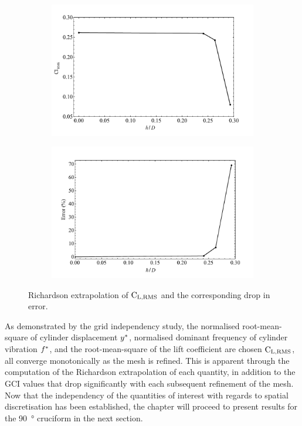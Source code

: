 \documentclass[oneside]{utmthesis}
\begin{document}
\begin{figure}
  \centering
  \begin{subfigure}[h]{1\textwidth}
    \includegraphics[width=\textwidth]{figs/gciClrms-1}
    \caption{}
    \label{fig:gciClrms-1}
  \end{subfigure}

  \begin{subfigure}[h]{1\textwidth}
    \includegraphics[width=\textwidth]{figs/gciClrms-2}
    \caption{}
    \label{fig:gciClrms-2}
  \end{subfigure}
  \caption{Richardson extrapolation of $\text{C}_{\text{L,RMS}}$ and the corresponding drop in error.} \label{fig:gciClrms}
\end{figure}

As demonstrated by the grid independency study, the normalised root-mean-square of cylinder displacement $y^{*}$, normalised dominant frequency of cylinder vibration $f^{*}$, and the root-mean-square of the lift coefficient are chosen $\text{C}_{\text{L,RMS}}$, all converge monotonically as the mesh is refined. This is apparent through the computation of the Richardson extrapolation of each quantity, in addition to the GCI values that drop significantly with each subsequent refinement of the mesh. Now that the independency of the quantities of interest with regards to spatial discretisation has been established, the chapter will proceed to present results for the \SI{90}{\degree} cruciform in the next section.
\end{document}
